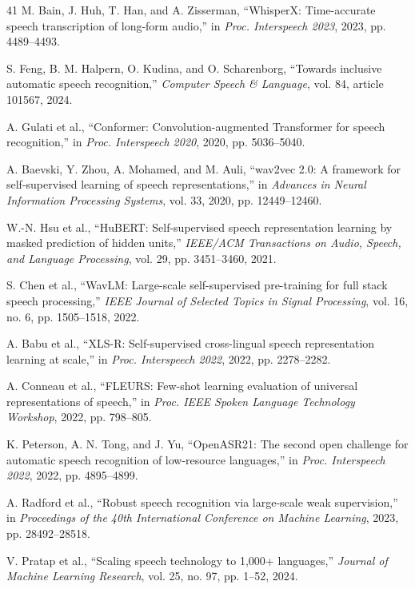 \documentclass[11pt]{article}
\begin{document}
\begin{thebibliography}{41}
M. Bain, J. Huh, T. Han, and A. Zisserman, ``WhisperX: Time-accurate speech transcription of long-form audio,'' in \textit{Proc. Interspeech 2023}, 2023, pp. 4489--4493.

S. Feng, B. M. Halpern, O. Kudina, and O. Scharenborg, ``Towards inclusive automatic speech recognition,'' \textit{Computer Speech \& Language}, vol. 84, article 101567, 2024.

A. Gulati et al., ``Conformer: Convolution-augmented Transformer for speech recognition,'' in \textit{Proc. Interspeech 2020}, 2020, pp. 5036--5040.

A. Baevski, Y. Zhou, A. Mohamed, and M. Auli, ``wav2vec 2.0: A framework for self-supervised learning of speech representations,'' in \textit{Advances in Neural Information Processing Systems}, vol. 33, 2020, pp. 12449--12460.

W.-N. Hsu et al., ``HuBERT: Self-supervised speech representation learning by masked prediction of hidden units,'' \textit{IEEE/ACM Transactions on Audio, Speech, and Language Processing}, vol. 29, pp. 3451--3460, 2021.

S. Chen et al., ``WavLM: Large-scale self-supervised pre-training for full stack speech processing,'' \textit{IEEE Journal of Selected Topics in Signal Processing}, vol. 16, no. 6, pp. 1505--1518, 2022.

A. Babu et al., ``XLS-R: Self-supervised cross-lingual speech representation learning at scale,'' in \textit{Proc. Interspeech 2022}, 2022, pp. 2278--2282.

A. Conneau et al., ``FLEURS: Few-shot learning evaluation of universal representations of speech,'' in \textit{Proc. IEEE Spoken Language Technology Workshop}, 2022, pp. 798--805.

K. Peterson, A. N. Tong, and J. Yu, ``OpenASR21: The second open challenge for automatic speech recognition of low-resource languages,'' in \textit{Proc. Interspeech 2022}, 2022, pp. 4895--4899.

A. Radford et al., ``Robust speech recognition via large-scale weak supervision,'' in \textit{Proceedings of the 40th International Conference on Machine Learning}, 2023, pp. 28492--28518.

V. Pratap et al., ``Scaling speech technology to 1,000+ languages,'' \textit{Journal of Machine Learning Research}, vol. 25, no. 97, pp. 1--52, 2024.


\end{thebibliography}
\end{document}
